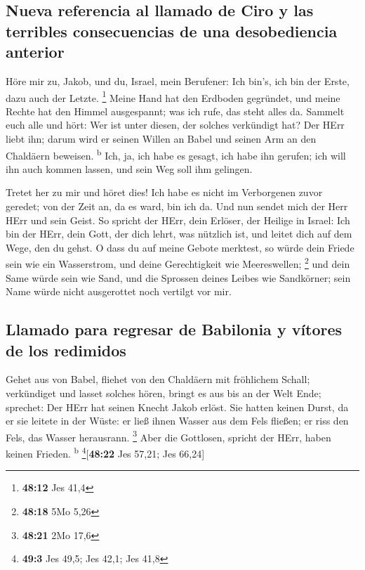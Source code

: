 \hypertarget{nueva-referencia-al-llamado-de-ciro-y-las-terribles-consecuencias-de-una-desobediencia-anterior}{%
\subsection{Nueva referencia al llamado de Ciro y las terribles
consecuencias de una desobediencia
anterior}\label{nueva-referencia-al-llamado-de-ciro-y-las-terribles-consecuencias-de-una-desobediencia-anterior}}

 Höre mir zu, Jakob, und du, Israel, mein Berufener: Ich
bin's, ich bin der Erste, dazu auch der Letzte. \footnote{\textbf{48:12}
  Jes 41,4}  Meine Hand hat den Erdboden gegründet, und
meine Rechte hat den Himmel ausgespannt; was ich rufe, das steht alles
da.  Sammelt euch alle und hört: Wer ist unter diesen,
der solches verkündigt hat? Der HErr liebt ihn; darum wird er seinen
Willen an Babel und seinen Arm an den Chaldäern beweisen.
\textsuperscript{b}  Ich, ja, ich habe es gesagt, ich
habe ihn gerufen; ich will ihn auch kommen lassen, und sein Weg soll ihm
gelingen.

 Tretet her zu mir und höret dies! Ich habe es nicht im
Verborgenen zuvor geredet; von der Zeit an, da es ward, bin ich da. Und
nun sendet mich der Herr HErr und sein Geist.  So spricht
der HErr, dein Erlöser, der Heilige in Israel: Ich bin der HErr, dein
Gott, der dich lehrt, was nützlich ist, und leitet dich auf dem Wege,
den du gehst.  O dass du auf meine Gebote merktest, so
würde dein Friede sein wie ein Wasserstrom, und deine Gerechtigkeit wie
Meereswellen; \footnote{\textbf{48:18} 5Mo 5,26}  und
dein Same würde sein wie Sand, und die Sprossen deines Leibes wie
Sandkörner; sein Name würde nicht ausgerottet noch vertilgt vor mir.

\hypertarget{llamado-para-regresar-de-babilonia-y-vuxedtores-de-los-redimidos}{%
\subsection{Llamado para regresar de Babilonia y vítores de los
redimidos}\label{llamado-para-regresar-de-babilonia-y-vuxedtores-de-los-redimidos}}

 Gehet aus von Babel, fliehet von den Chaldäern mit
fröhlichem Schall; verkündiget und lasset solches hören, bringt es aus
bis an der Welt Ende; sprechet: Der HErr hat seinen Knecht Jakob erlöst.
 Sie hatten keinen Durst, da er sie leitete in der Wüste:
er ließ ihnen Wasser aus dem Fels fließen; er riss den Fels, das Wasser
herausrann. \footnote{\textbf{48:21} 2Mo 17,6}  Aber die
Gottlosen, spricht der HErr, haben keinen Frieden. \textsuperscript{b}
\footnote{\textbf{49:3} Jes 49,5; Jes 42,1; Jes 41,8}{[}\textbf{48:22}
Jes 57,21; Jes 66,24{]}

